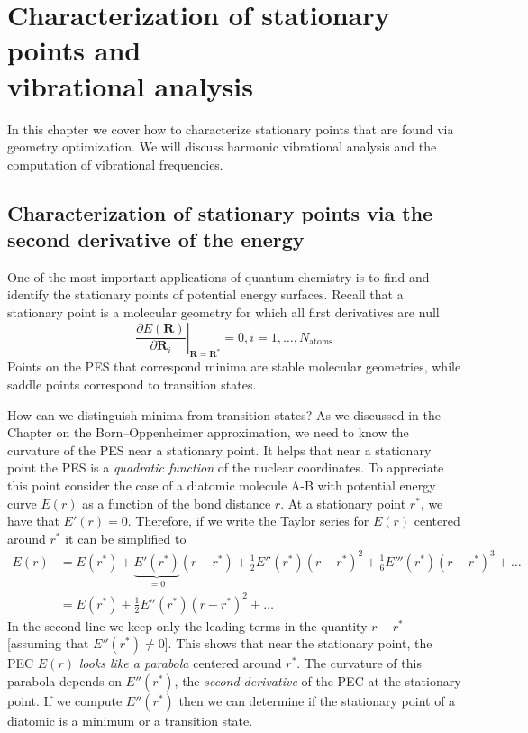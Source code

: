 \documentclass[../Main/notes.tex]{subfiles}
\begin{document}
\chapter{Characterization of stationary points and\\ vibrational analysis}

In this chapter we cover how to characterize stationary points that are found via geometry optimization.
We will discuss harmonic vibrational analysis and the computation of vibrational frequencies.

\section{Characterization of stationary points via the second derivative of the energy}

One of the most important applications of quantum chemistry is to find and identify the stationary points of  potential energy surfaces.
Recall that a stationary point is a molecular geometry for which all first derivatives are null
\begin{equation}
\left.\frac{\partial E(\mathbf{R})}{\partial \mathbf{R}_i}\right|_{\mathbf{R}=\mathbf{R}^*} = 0, i=1,\ldots,N_\mathrm{atoms}
\end{equation}
Points on the PES that correspond minima are stable molecular geometries, while saddle points correspond to transition states.

How can we distinguish minima from transition states? As we discussed in the Chapter on the Born--Oppenheimer approximation, we need to know the curvature of the PES near a stationary point.
It helps that near a stationary point the PES is a \emph{quadratic function} of the nuclear coordinates.
To appreciate this point consider the case of a diatomic molecule A-B with potential energy curve $E(r)$ as a function of the bond distance $r$.
At a stationary point $r^*$, we have that $E'(r) = 0$.
Therefore, if we write the Taylor series for $E(r)$ centered around $r^*$ it can be simplified to 
\begin{equation}
\begin{split}
E(r) & = E(r^*) + \underbrace{E'(r^*)}_{=0} (r - r^*) + \frac{1}{2} E''(r^*) (r - r^*)^2 + \frac{1}{6} E'''(r^*) (r - r^*)^3 + \ldots \\
& = E(r^*) + \frac{1}{2} E''(r^*) (r - r^*)^2 + \ldots
\end{split}
\end{equation}
In the second line we keep only the leading terms in the quantity $r - r^*$ [assuming that $E''(r^*) \neq 0$].
This shows that near the stationary point, the PEC $E(r)$ \emph{looks like a parabola} centered around $r^*$.
The curvature of this parabola depends on $E''(r^*)$, the \emph{second derivative} of the PEC at the stationary point.
If we compute $E''(r^*)$ then we can determine if the stationary point of a diatomic is a minimum or a transition state.
\end{document}
